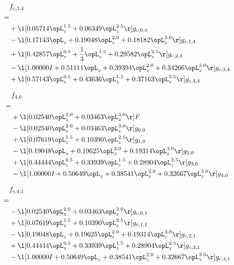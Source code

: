 \begin{alignat}{2} 
\label{eq:f_34_0} 
& f_{c,3,4} \nonumber \\ 
 = \\ 
& + \l[  0.05714 \opL_z^{1.5} +  0.06349 \opL_z^{2.5}  \r] g_{c,0,4} \nonumber \\ 
& - \l[  0.17143 \opL_z +  0.19048 \opL_z^{2.0} +  0.18182 \opL_z^{3.0}  \r] g_{c,1,4} \nonumber \\ 
& + \l[  0.42857 \opL_z^{0.5} + \frac{1}{3} \opL_z^{1.5} +  0.29582 \opL_z^{2.5}  \r] g_{c,2,4} \nonumber \\ 
& - \l[  1.00000 I +  0.51111 \opL_z +  0.39394 \opL_z^{2.0} +  0.34266 \opL_z^{3.0}  \r] g_{c,3,4} \nonumber \\ 
& + \l[  0.57143 \opL_z^{0.5} +  0.43636 \opL_z^{1.5} +  0.37163 \opL_z^{2.5}  \r] g_{c,4,4} \nonumber \\ 
\end{alignat} 


\begin{alignat}{2} 
\label{eq:f_40_0} 
& f_{4,0} \nonumber \\ 
 = \\ 
& + \l[  0.02540 \opL_z^{2.0} +  0.03463 \opL_z^{3.0}  \r] F \nonumber \\ 
& - \l[  0.02540 \opL_z^{2.0} +  0.03463 \opL_z^{3.0}  \r] g_{0,0} \nonumber \\ 
& + \l[  0.07619 \opL_z^{1.5} +  0.10390 \opL_z^{2.5}  \r] g_{1,0} \nonumber \\ 
& - \l[  0.19048 \opL_z +  0.19625 \opL_z^{2.0} +  0.19314 \opL_z^{3.0}  \r] g_{2,0} \nonumber \\ 
& + \l[  0.44444 \opL_z^{0.5} +  0.33939 \opL_z^{1.5} +  0.28904 \opL_z^{2.5}  \r] g_{3,0} \nonumber \\ 
& - \l[  1.00000 I +  0.50649 \opL_z +  0.38541 \opL_z^{2.0} +  0.32667 \opL_z^{3.0}  \r] g_{4,0} \nonumber \\ 
\end{alignat} 


\begin{alignat}{2} 
\label{eq:f_41_0} 
& f_{c,4,1} \nonumber \\ 
 = \\ 
& - \l[  0.02540 \opL_z^{2.0} +  0.03463 \opL_z^{3.0}  \r] g_{c,0,1} \nonumber \\ 
& + \l[  0.07619 \opL_z^{1.5} +  0.10390 \opL_z^{2.5}  \r] g_{c,1,1} \nonumber \\ 
& - \l[  0.19048 \opL_z +  0.19625 \opL_z^{2.0} +  0.19314 \opL_z^{3.0}  \r] g_{c,2,1} \nonumber \\ 
& + \l[  0.44444 \opL_z^{0.5} +  0.33939 \opL_z^{1.5} +  0.28904 \opL_z^{2.5}  \r] g_{c,3,1} \nonumber \\ 
& - \l[  1.00000 I +  0.50649 \opL_z +  0.38541 \opL_z^{2.0} +  0.32667 \opL_z^{3.0}  \r] g_{c,4,1} \nonumber \\ 
\end{alignat} 


